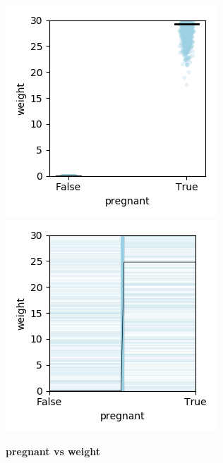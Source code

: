 \documentclass[12pt]{article}
\begin{document}
\begin{figure}[htbp]
\begin{center}
\includegraphics[scale=0.7]{images/pregnant_vs_weight_stratpd.png}
\includegraphics[scale=0.7]{images/pregnant_vs_weight_pdp.png}
\caption{{\bf  pregnant vs weight}}
\label{fig:pregnant_vs_weight}
\end{center}
\end{figure}
\end{document}

